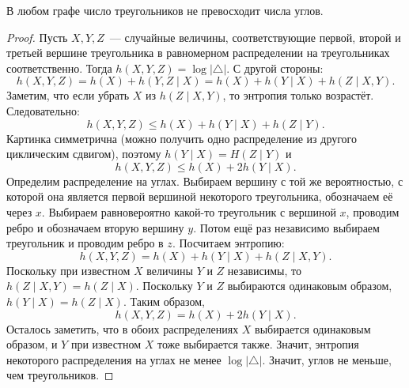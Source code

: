 \begin{theorem}[\cite{KR11}]
    В любом графе число треугольников не превосходит числа углов.
\end{theorem}
\begin{proof}
    Пусть $X, Y, Z$~--- случайные величины, соответствующие первой, второй и третьей вершине треугольника
    в равномерном распределении на треугольниках соответственно. Тогда
    $h(X, Y, Z) = \log |\pmb{\triangle}|$. С другой стороны:
    $$
        h(X, Y, Z) = h(X) + h(Y, Z \mid X) = h(X) + h(Y \mid X) + h(Z \mid X, Y).
    $$
    Заметим, что если убрать $X$ из $h(Z \mid X, Y)$, то энтропия только возрастёт. Следовательно:
    $$
        h(X, Y, Z) \le h(X) + h(Y \mid X) + h(Z \mid Y).
    $$
    Картинка симметрична (можно получить одно распределение из другого циклическим сдвигом), поэтому
    $h(Y \mid X) = H(Z \mid Y)$ и 
    $$
        h(X, Y, Z) \le h(X) + 2h(Y \mid X).
    $$
    Определим распределение на углах. Выбираем вершину с той же вероятностью, с которой она является
    первой вершиной некоторого треугольника, обозначаем её через $x$. Выбираем равновероятно какой-то
    треугольник с вершиной $x$, проводим ребро и обозначаем вторую вершину $y$. Потом ещё раз независимо
    выбираем треугольник и проводим ребро в $z$. Посчитаем энтропию:
    $$
        h(X, Y, Z) = h(X) + h(Y \mid X) + h(Z \mid X,Y).
    $$
    Поскольку при известном $X$ величины $Y$ и $Z$ независимы, то $h(Z \mid X, Y) = h(Z \mid
    X)$. Поскольку $Y$ и $Z$ выбираются одинаковым образом, $h(Y \mid X) = h(Z \mid X)$. Таким образом,
    $$
    h(X, Y, Z) = h(X) + 2h(Y \mid X).
    $$
    Осталось заметить, что в обоих распределениях $X$ выбирается одинаковым образом, и $Y$ при
    известном $X$ тоже выбирается также. Значит, энтропия некоторого распределения на углах не менее
    $\log |\pmb{\triangle}|$. Значит, углов не меньше, чем треугольников.
\end{proof}
